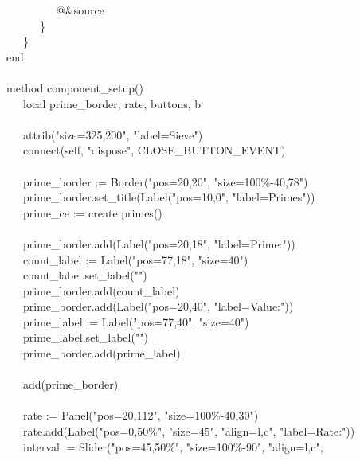 {\>   \ \ \ \ \ \ \ \ \ @\&source \\
\>   \ \ \ \ \ \ \} \\
\>   \ \ \ \} \\
\>   end \\
\ \\
\>   method component\_setup() \\
\>   \ \ \ local prime\_border, rate, buttons, b \\
\ \\
\>   \ \ \ attrib("size=325,200",
"label=Sieve") \\
\>   \ \ \ connect(self, "dispose",
CLOSE\_BUTTON\_EVENT) \\
\ \\
\>   \ \ \ prime\_border :=
Border("pos=20,20",
"size=100\%-40,78") \\
\>   \ \ \ prime\_border.set\_title(Label("pos=10,0",
"label=Primes")) \\
\>   \ \ \ prime\_ce := create primes() \\
\ \\
\>   \ \ \ prime\_border.add(Label("pos=20,18",
"label=Prime:")) \\
\>   \ \ \ count\_label :=
Label("pos=77,18",
"size=40") \\
\>   \ \ \ count\_label.set\_label("") \\
\>   \ \ \ prime\_border.add(count\_label) \\
\>   \ \ \ prime\_border.add(Label("pos=20,40",
"label=Value:")) \\
\>   \ \ \ prime\_label :=
Label("pos=77,40",
"size=40") \\
\>   \ \ \ prime\_label.set\_label("") \\
\>   \ \ \ prime\_border.add(prime\_label) \\
\ \\
\>   \ \ \ add(prime\_border) \\
\ \\
\>   \ \ \ rate := Panel("pos=20,112",
"size=100\%-40,30") \\
\>   \ \ \ rate.add(Label("pos=0,50\%",
"size=45",
"align=l,c",
"label=Rate:")) \\
\>   \ \ \ interval := Slider("pos=45,50\%", "size=100\%-90", "align=l,c", \\

}
